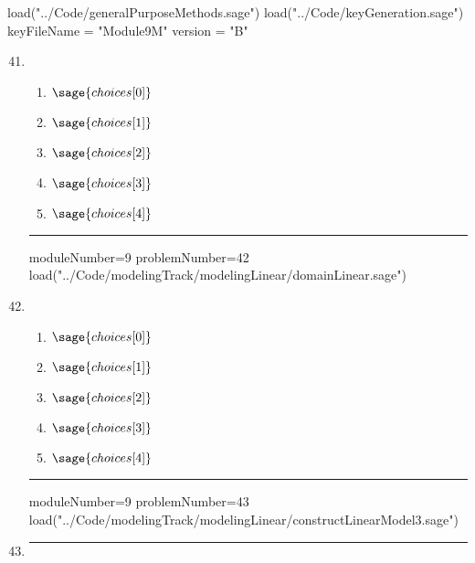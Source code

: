 \documentclass[14pt]{article}
\newcommand{\litem}[1]{\item#1\hspace*{-1cm}\rule{\textwidth}{0.4pt}}
\begin{document}
\pagestyle{fancy}

\begin{sagesilent}
load("../Code/generalPurposeMethods.sage")
load("../Code/keyGeneration.sage")
keyFileName = "Module9M"
version = "B"
\end{sagesilent}

\begin{enumerate}
\setcounter{enumi}{40}


\begin{sagesilent}
moduleNumber=9
problemNumber=41
load("../Code/modelingTrack/modelingLinear/constructLinearModel2.sage")
\end{sagesilent}

\litem{ 


	\begin{enumerate}[label=\Alph*.]
  \item \( \sage{choices[0]} \)
  \item \( \sage{choices[1]} \)
  \item \( \sage{choices[2]} \)
  \item \( \sage{choices[3]} \)
  \item \( \sage{choices[4]} \)
	\end{enumerate}
}

\begin{sagesilent}
moduleNumber=9
problemNumber=42
load("../Code/modelingTrack/modelingLinear/domainLinear.sage")
\end{sagesilent}

\litem{ 


	\begin{enumerate}[label=\Alph*.]
  \item \( \sage{choices[0]} \)
  \item \( \sage{choices[1]} \)
  \item \( \sage{choices[2]} \)
  \item \( \sage{choices[3]} \)
  \item \( \sage{choices[4]} \)
	\end{enumerate}
}

\begin{sagesilent}
moduleNumber=9
problemNumber=43
load("../Code/modelingTrack/modelingLinear/constructLinearModel3.sage")
\end{sagesilent}

\litem{ 

}
\end{enumerate}
\end{document}
